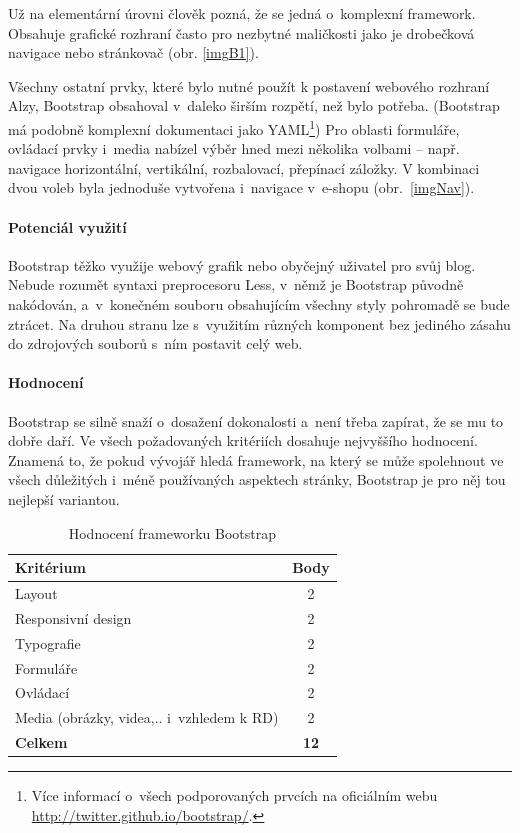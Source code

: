 \documentclass[thesis=B,czech]{FITthesis}[2012/06/26]
\begin{document}
Už na elementární úrovni člověk pozná, že se jedná o~komplexní framework. Obsahuje grafické rozhraní často pro nezbytné maličkosti jako je drobečková navigace nebo stránkovač (obr. \ref{imgB1}).

Všechny ostatní prvky, které bylo nutné použít k postavení webového rozhraní Alzy, Bootstrap obsahoval v~daleko širším rozpětí, než bylo potřeba. (Bootstrap má podobně komplexní dokumentaci jako YAML\footnote{Více informací o~všech podporovaných prvcích na oficiálním webu \\ \url{http://twitter.github.io/bootstrap/}.}) Pro oblasti formuláře, ovládací prvky i~media nabízel výběr hned mezi několika volbami -- např. navigace horizontální, vertikální, rozbalovací, přepínací záložky. V kombinaci dvou voleb byla jednoduše vytvořena i~navigace v~e-shopu (obr.~\ref{imgNav}).

\paragraph{Potenciál využití}

 Bootstrap těžko využije webový grafik nebo obyčejný uživatel pro svůj blog. Nebude rozumět syntaxi preprocesoru Less, v~němž je Bootstrap původně nakódován, a~v~konečném souboru obsahujícím všechny styly pohromadě se bude ztrácet. Na druhou stranu lze s~využitím různých komponent bez jediného zásahu do zdrojových souborů s~ním postavit celý web. 

\paragraph{Hodnocení}

Bootstrap se silně snaží o~dosažení dokonalosti a~není třeba zapírat, že se mu to dobře daří. Ve všech požadovaných kritériích dosahuje nejvyššího hodnocení. Znamená to, že pokud vývojář hledá framework, na který se může spolehnout ve všech důležitých i~méně používaných aspektech stránky, Bootstrap je pro něj tou nejlepší variantou.

\begin{table}\centering
 	\caption[Hodnocení Bootstrapu]{Hodnocení frameworku Bootstrap}\label{tab:bootstrap}
 	\begin{tabular}{|l|c|}\hline
 	\textbf{Kritérium} & \textbf{Body}\tabularnewline
 	\hline\hline
		Layout & 2\tabularnewline
		\hline 
		 Responsivní design & 2\tabularnewline
		\hline 
		Typografie & 2\tabularnewline
		\hline 
		Formuláře & 2\tabularnewline
		\hline 
		Ovládací & 2\tabularnewline
		\hline 
		Media  (obrázky, videa,.. i~vzhledem k RD) & 2\tabularnewline
		\hline 
		\textbf{Celkem} & \textbf{12}\tabularnewline
		\hline 
 	\end{tabular}
\end{table} 
\end{document}
